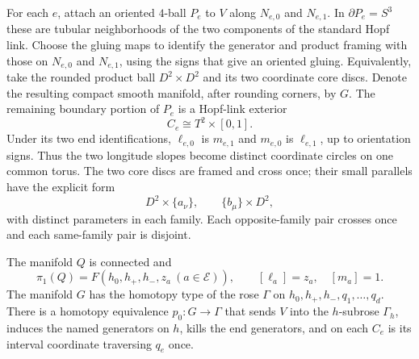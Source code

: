 For each $e$, attach an oriented $4$-ball $P_e$ to $V$ along $N_{e,0}$
and $N_{e,1}$.  In $\partial P_e=S^3$ these are tubular neighborhoods
of the two components of the standard Hopf link.  Choose the gluing
maps to identify the generator and product framing with those on
$N_{e,0}$ and $N_{e,1}$, using the signs that give an oriented gluing.
Equivalently, take the rounded product ball $D^2\times D^2$ and its two
coordinate core discs.  Denote the resulting compact smooth manifold,
after rounding corners, by $G$.  The remaining boundary portion of
$P_e$ is a Hopf-link exterior
\begin{equation}\label{geo:hopf-collar}
 C_e\cong T^2\times[0,1].
\end{equation}
Under its two end identifications, $\ell_{e,0}$ is $m_{e,1}$ and
$m_{e,0}$ is $\ell_{e,1}$, up to orientation signs.  Thus the two
longitude slopes become distinct coordinate circles on one common
torus.  The two core discs are framed and cross once; their small
parallels have the explicit form
\begin{equation}\label{geo:product-sheets}
 D^2\times\{a_\nu\},\qquad \{b_\mu\}\times D^2,
\end{equation}
with distinct parameters in each family.  Each opposite-family pair
crosses once and each same-family pair is disjoint.

\begin{lemma}\label{geo:graph}
The manifold $Q$ is connected and
\[
 \pi_1(Q)=F(h_0,h_+,h_-,z_a\ (a\in\mathcal E)),
 \qquad [\ell_a]=z_a,\quad [m_a]=1.
\]
The manifold $G$ has the homotopy type of the rose
$\Gamma$ on $h_0,h_+,h_-,q_1,\ldots,q_d$.  There is a homotopy
equivalence $p_0:G\longrightarrow\Gamma$ that sends $V$ into the
$h$-subrose $\Gamma_h$, induces the named generators on $h$, kills
the end generators, and on each $C_e$ is its interval coordinate
traversing $q_e$ once.
\end{lemma}

